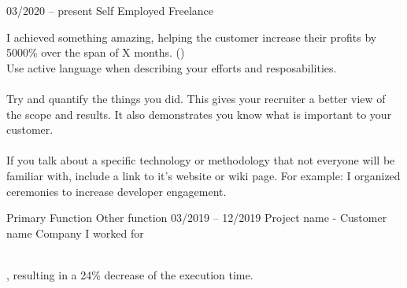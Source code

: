\documentclass[9pt, blue]{./template/developercv} %
\begin{document}
\vspace{8pt}
\vspace{2.1mm}
\begin{entrylist}
	\entry
	{03/2020 -- present }
	{}
	{Self Employed \space\cpipe\space Freelance}
	{
		\vspace{0.3mm}
		\begin{minipage}[t]{0.75\textwidth}
			\vspace{-\baselineskip}
			\itemmarker I achieved something amazing, helping the customer increase their profits by 5000\% over the span of X months. ()\\
			\itemmarker  Use active language when describing your efforts and resposabilities. \\
			\vspace{-3mm}\\
			\itemmarker Try and quantify the things you did. This gives your recruiter a better view of the scope and results. It also demonstrates you know what is important to your customer.\\
 			\vspace{-3mm}\\
 			\itemmarker If you talk about a specific technology or methodology that not everyone will be familiar with, include a link to it's website or wiki page. For example: I organized  ceremonies to increase developer engagement.\\
 			\vspace{-3mm}
		\end{minipage}

	}
	{Primary Function \band Other function}
	\entry
	{03/2019 -- 12/2019}
	{Project name - Customer name}
	{Company I worked for}
	{
		\vspace{0.3mm}
		\begin{minipage}[t]{0.75\textwidth}
			\vspace{-\baselineskip}
			\itemmarker \lorem \\
			\itemmarker \lorem, resulting in a 24\% decrease of the execution time.\\
			\vspace{-3mm}\\
			\itemmarker \lorem \lorem \\
			\vspace{-3mm}
		\end{minipage}

}
\end{entrylist}
\end{document}
